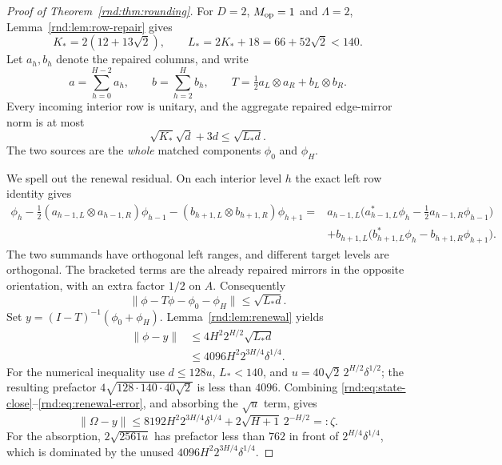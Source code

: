 \begin{proof}[Proof of Theorem~\ref{rnd:thm:rounding}]
For $D=2$, $M_{\rm op}=1$ and $\Lambda=2$, Lemma~\ref{rnd:lem:row-repair} gives
\[
 K_*=2(12+13\sqrt2),\qquad
 L_*=2K_*+18=66+52\sqrt2<140.
\]
Let $a_h,b_h$ denote the repaired columns, and write
\[
 a=\sum_{h=0}^{H-2}a_h,\qquad
 b=\sum_{h=2}^{H}b_h,\qquad
 T=\tfrac12a_L\otimes a_R+b_L\otimes b_R.
\]
Every incoming interior row is unitary, and the aggregate repaired edge-mirror norm is at most
\[
 \sqrt{K_*}\sqrt d+3d\le\sqrt{L_*d}.
\]
The two sources are the \emph{whole} matched components $\phi_0$ and $\phi_H$.

We spell out the renewal residual. On each interior level $h$ the exact left row identity gives
\begin{align*}
 \phi_h-\tfrac12(a_{h-1,L}\otimes a_{h-1,R})\phi_{h-1}
             -(b_{h+1,L}\otimes b_{h+1,R})\phi_{h+1}
 ={}&a_{h-1,L}\bigl(a_{h-1,L}^*\phi_h
                         -\tfrac12a_{h-1,R}\phi_{h-1}\bigr)\\
 &+b_{h+1,L}\bigl(b_{h+1,L}^*\phi_h
                         -b_{h+1,R}\phi_{h+1}\bigr).
\end{align*}
The two summands have orthogonal left ranges, and different target levels are orthogonal. The bracketed terms are the already repaired mirrors in the opposite orientation, with an extra factor $1/2$ on $A$. Consequently
\[
 \|\phi-T\phi-\phi_0-\phi_H\|\le\sqrt{L_*d}.
\]
Set $y=(I-T)^{-1}(\phi_0+\phi_H)$. Lemma~\ref{rnd:lem:renewal} yields
\begin{align}
 \|\phi-y\|
 &\le4H^2 2^{H/2}\sqrt{L_*d}\nonumber\\
 &\le4096H^2 2^{3H/4}\delta^{1/4}.              \label{rnd:eq:renewal-error}
\end{align}
For the numerical inequality use $d\le128u$, $L_*<140$, and
$u=40\sqrt2\,2^{H/2}\delta^{1/2}$; the resulting prefactor
$4\sqrt{128\cdot140\cdot40\sqrt2}$ is less than $4096$.
Combining \eqref{rnd:eq:state-close}--\eqref{rnd:eq:renewal-error}, and absorbing the $\sqrt u$ term, gives
\begin{equation}\label{rnd:eq:total-error}
 \|\Omega-y\|\le
 8192H^2 2^{3H/4}\delta^{1/4}
 +2\sqrt{H+1}\,2^{-H/2}=:\zeta.
\end{equation}
For the absorption, $2\sqrt{2561u}$ has prefactor less than $762$ in front of $2^{H/4}\delta^{1/4}$, which is dominated by the unused $4096H^2 2^{3H/4}\delta^{1/4}$.


\end{proof}
